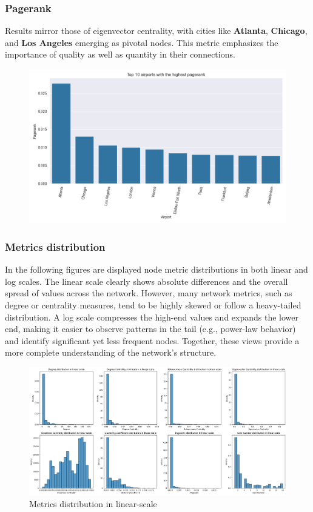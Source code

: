 \documentclass[12pt]{article}
\begin{document}
    \subsubsection{Pagerank}
    Results mirror those of eigenvector centrality, with cities like \textbf{Atlanta}, \textbf{Chicago}, and \textbf{Los Angeles} emerging as pivotal nodes. This metric emphasizes the importance of quality as well as quantity in their connections.
    \begin{figure}[H]
        \centering
        \includegraphics[width=0.8\linewidth]{img/pagerank}
    \end{figure}

    \subsubsection{Metrics distribution}
    In the following figures are displayed node metric distributions in both linear and log scales. The linear scale clearly shows absolute differences and the overall spread of values across the network. However, many network metrics, such as degree or centrality measures, tend to be highly skewed or follow a heavy-tailed distribution. A log scale compresses the high-end values and expands the lower end, making it easier to observe patterns in the tail (e.g., power-law behavior) and identify significant yet less frequent nodes. Together, these views provide a more complete understanding of the network's structure.
    \begin{figure}[H]
        \centering
        \includegraphics[width=0.8\linewidth]{img/metrics_output}
        \caption{Metrics distribution in linear-scale}
    \end{figure}
\end{document}
